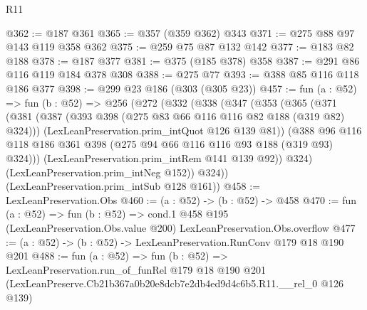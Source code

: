 \begin{lexlean}{R11}
\begin{coremodule}
@362 := @187 @361
@365 := @357 (@359 @362) @343
@371 := @275 @88 @97 @143 @119 @358 @362
@375 := @259 @75 @87 @132 @142
@377 := @183 @82 @188
@378 := @187 @377
@381 := @375 (@185 @378) @358
@387 := @291 @86 @116 @119 @184 @378 @308
@388 := @275 @77
@393 := @388 @85 @116 @118 @186 @377
@398 := @299 @23 @186 (@303 (@305 @23))
@457 := fun (a : @52) =>
  fun (b : @52) =>
  @256
    (@272
      (@332
        (@338
          (@347
            (@353
              (@365
                (@371
                  (@381
                    (@387 (@393 @398 (@275 @83 @66 @116 @116 @82 @188 (@319 @82) @324)))
                    (LexLeanPreservation.prim_intQuot @126 @139 @81))
                  (@388
                    @96
                    @116
                    @118
                    @186
                    @361
                    @398
                    (@275 @94 @66 @116 @116 @93 @188 (@319 @93) @324)))
                (LexLeanPreservation.prim_intRem @141 @139 @92))
              @324)
            (LexLeanPreservation.prim_intNeg @152))
          @324))
      (LexLeanPreservation.prim_intSub @128 @161))
@458 := LexLeanPreservation.Obs
@460 := (a : @52) -> (b : @52) -> @458
@470 := fun (a : @52) =>
  fun (b : @52) =>
  cond.{1} @458 @195 (LexLeanPreservation.Obs.value @200) LexLeanPreservation.Obs.overflow
@477 := (a : @52) -> (b : @52) -> LexLeanPreservation.RunConv @179 @18 @190 @201
@488 := fun (a : @52) =>
  fun (b : @52) =>
  LexLeanPreservation.run_of_funRel
    @179
    @18
    @190
    @201
    (LexLeanPreserve.Cb21b367a0b20e8dcb7e2db4ed9d4c6b5.R11.__rel_0 @126 @139)
\end{coremodule}
\end{lexlean}
